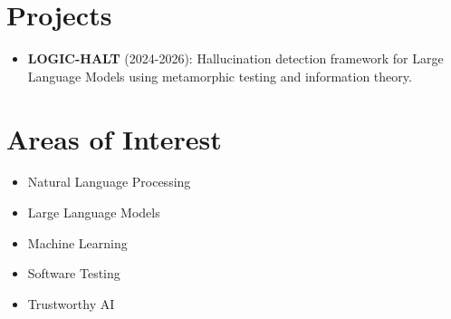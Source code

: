 \section*{Projects}

\begin{itemize}
    \item \textbf{LOGIC-HALT} (2024-2026): Hallucination detection framework for Large Language Models using metamorphic testing and information theory.
\end{itemize}

\section*{Areas of Interest}

\begin{itemize}
    \item Natural Language Processing
    \item Large Language Models
    \item Machine Learning
    \item Software Testing
    \item Trustworthy AI
\end{itemize}

\clearpage
